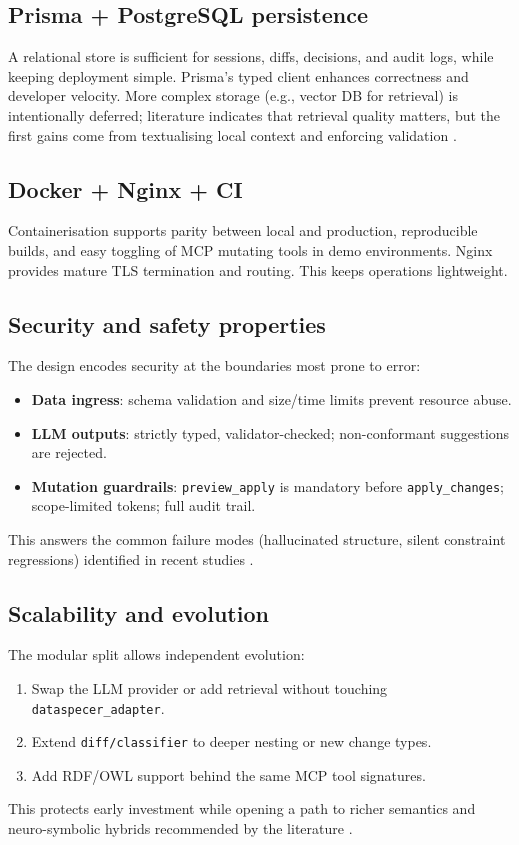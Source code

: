\subsection*{Prisma + PostgreSQL persistence}
A relational store is sufficient for sessions, diffs, decisions, and audit logs, while keeping deployment simple. Prisma’s typed client enhances correctness and developer velocity. More complex storage (e.g., vector DB for retrieval) is intentionally deferred; literature indicates that retrieval quality matters, but the first gains come from textualising local context and enforcing validation \cite{giglou2024llms4om,neubauer2025jsonschema}.

\subsection*{Docker + Nginx + CI}
Containerisation supports parity between local and production, reproducible builds, and easy toggling of MCP mutating tools in demo environments. Nginx provides mature TLS termination and routing. This keeps operations lightweight.

\subsection*{Security and safety properties}
The design encodes security at the boundaries most prone to error:
\begin{itemize}
  \item \textbf{Data ingress}: schema validation and size/time limits prevent resource abuse.
  \item \textbf{LLM outputs}: strictly typed, validator-checked; non-conformant suggestions are rejected.
  \item \textbf{Mutation guardrails}: \texttt{preview\_apply} is mandatory before \texttt{apply\_changes}; scope-limited tokens; full audit trail.
\end{itemize}
This answers the common failure modes (hallucinated structure, silent constraint regressions) identified in recent studies \cite{allen2024classmembership,neubauer2025jsonschema}.

\subsection*{Scalability and evolution}
The modular split allows independent evolution:
\begin{enumerate}
  \item Swap the LLM provider or add retrieval without touching \texttt{dataspecer\_adapter}.
  \item Extend \texttt{diff/classifier} to deeper nesting or new change types.
  \item Add RDF/OWL support behind the same MCP tool signatures.
\end{enumerate}
This protects early investment while opening a path to richer semantics and neuro-symbolic hybrids recommended by the literature \cite{zhang2025ontourl}.

